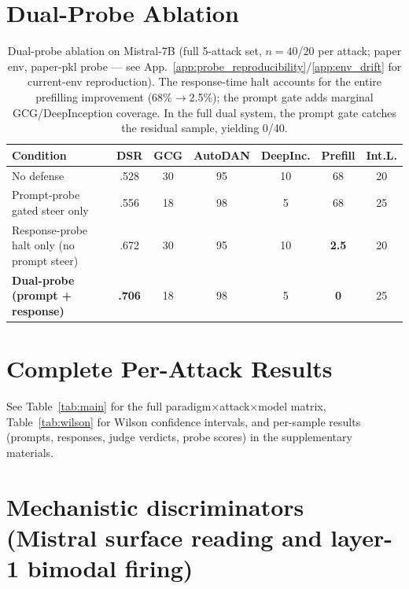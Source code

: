 \documentclass{article}
\begin{document}
\section{Dual-Probe Ablation}
\label{app:ablation}

\begin{table}[H]
\caption{Dual-probe ablation on Mistral-7B (full 5-attack set, $n=40$/$20$ per attack; paper env, paper-pkl probe --- see App.~\ref{app:probe_reproducibility}/\ref{app:env_drift} for current-env reproduction). The response-time halt accounts for the entire prefilling improvement (68\%$\to$2.5\%); the prompt gate adds marginal GCG/DeepInception coverage. In the full dual system, the prompt gate catches the residual sample, yielding 0/40.}
\label{tab:ablation}
\centering
\small
\begin{tabular}{lc ccccc}
\toprule
\textbf{Condition} & \textbf{DSR} & \textbf{GCG} & \textbf{AutoDAN} & \textbf{DeepInc.} & \textbf{Prefill} & \textbf{Int.L.} \\
\midrule
No defense                                & .528 & 30 & 95 & 10 & 68 & 20 \\
Prompt-probe gated steer only             & .556 & 18 & 98 & 5  & 68 & 25 \\
Response-probe halt only (no prompt steer)& .672 & 30 & 95 & 10 & \textbf{2.5} & 20 \\
\textbf{Dual-probe (prompt + response)}   & \textbf{.706} & 18 & 98 & 5  & \textbf{0} & 25 \\
\bottomrule
\end{tabular}
\end{table}

\section{Complete Per-Attack Results}
\label{app:full_results}

See Table~\ref{tab:main} for the full paradigm$\times$attack$\times$model matrix, Table~\ref{tab:wilson} for Wilson confidence intervals, and per-sample results (prompts, responses, judge verdicts, probe scores) in the supplementary materials.

\section{Mechanistic discriminators (Mistral surface reading and layer-1 bimodal firing)}
\label{app:mech_discriminators}
\end{document}
